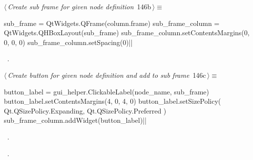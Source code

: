 \documentclass[%
    a4paper,    %
    justified,  %
    nobib,      %
    openany     %
]{tufte-book}
\begin{document}
%
\begin{flushleft} \small
\begin{minipage}{\linewidth}\label{scrap160}\raggedright\small
{} $\langle\,${\itshape Create sub frame for given node definition}\nobreak\ {\footnotesize {146b}}$\,\rangle\equiv$
\vspace{-1ex}
\begin{pythoncode}
    sub_frame = QtWidgets.QFrame(column.frame)
    sub_frame_column = QtWidgets.QHBoxLayout(sub_frame)
    sub_frame_column.setContentsMargins(0, 0, 0, 0)
    sub_frame_column.setSpacing(0)|\NWsep|
\end{pythoncode}
\vspace{1.5ex}
\footnotesize
\begin{list}{}{\setlength{\itemsep}{-\parsep}\setlength{\itemindent}{-\leftmargin}}
\item \NWtxtMacroRefIn\ .

\item{}
\end{list}
\end{minipage}\vspace{4ex}
\end{flushleft}
%
\begin{flushleft} \small
\begin{minipage}{\linewidth}\label{scrap161}\raggedright\small
{} $\langle\,${\itshape Create button for given node definition and add to sub frame}\nobreak\ {\footnotesize {146c}}$\,\rangle\equiv$
\vspace{-1ex}
\begin{pythoncode}
    button_label = gui_helper.ClickableLabel(node_name, sub_frame)
    button_label.setContentsMargins(4, 0, 4, 0)
    button_label.setSizePolicy(
        Qt.QSizePolicy.Expanding, Qt.QSizePolicy.Preferred
    )
    sub_frame_column.addWidget(button_label)|\NWsep|
\end{pythoncode}
\vspace{1.5ex}
\footnotesize
\begin{list}{}{\setlength{\itemsep}{-\parsep}\setlength{\itemindent}{-\leftmargin}}
\item \NWtxtMacroDefBy\ .
\item \NWtxtMacroRefIn\ .

\item{}
\end{list}
\end{minipage}\vspace{4ex}
\end{flushleft}
\end{document}
